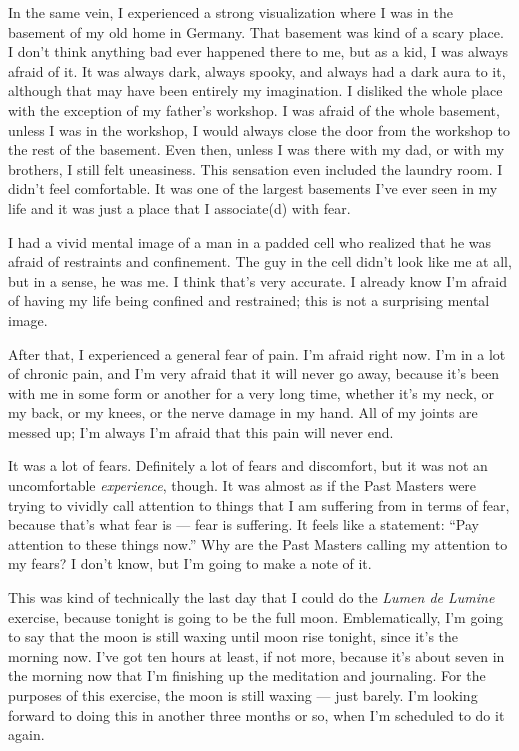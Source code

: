 \documentclass[b6paper]{article}
\newcommand{\ldl}{\emph{Lumen de Lumine} exercise}
\newcommand{\pms}{Past Masters}
\begin{document}
In the same vein, I experienced a strong visualization where I was in the basement of my old home in Germany. That basement was kind of a scary place. I don't think anything bad ever happened there to me, but as a kid, I was always afraid of it. It was always dark, always spooky, and always had a dark aura to it, although that may have been entirely my imagination. I disliked the whole place with the exception of my father's workshop. I was afraid of the whole basement, unless I was in the workshop, I would always close the door from the workshop to the rest of the basement. Even then, unless I was there with my dad, or with my brothers, I still felt uneasiness. This sensation even included the laundry room. I didn't feel comfortable. It was one of the largest basements I've ever seen in my life and it was just a place that I associate(d) with fear.

I had a vivid mental image of a man in a padded cell who realized that he was afraid of restraints and confinement. The guy in the cell didn't look like me at all, but in a sense, he was me. I think that's very accurate. I already know I'm afraid of having my life being confined and restrained; this is not a surprising mental image.

After that, I experienced a general fear of pain. I'm afraid right now. I'm in a lot of chronic pain, and I'm very afraid that it will never go away, because it's been with me in some form or another for a very long time, whether it's my neck, or my back, or my knees, or the nerve damage in my hand. All of my joints are messed up; I'm always I'm afraid that this pain will never end.

It was a lot of fears. Definitely a lot of fears and discomfort, but it was not an uncomfortable \textit{experience}, though. It was almost as if the Past Masters were trying to vividly call attention to things that I am suffering from in terms of fear, because that's what fear is --- fear is suffering. It feels like a statement: ``Pay attention to these things now.'' Why are the \pms{} calling my attention to my fears? I don't know, but I'm going to make a note of it. 

This was kind of technically the last day that I could do the \ldl{}, because tonight is going to be the full moon. Emblematically, I'm going to say that the moon is still waxing until moon rise tonight, since it's the morning now. I've got ten hours at least, if not more, because it's about seven in the morning now that I'm finishing up the meditation and journaling. For the purposes of this exercise, the moon is still waxing --- just barely. I'm looking forward to doing this in another three months or so, when I'm scheduled to do it again.
\end{document}
